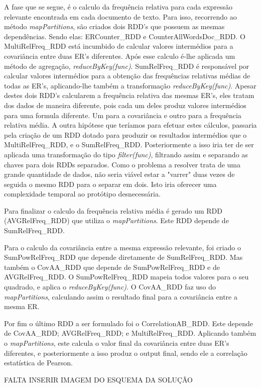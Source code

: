 A fase que se segue, é o calculo da frequência relativa para cada expressão relevante encontrada em cada documento de texto. Para isso, recorrendo ao método \textit{mapPartitions}, são criados dois RDD's que possuem as mesmas dependências. Sendo elas: ERCounter\_RDD e CounterAllWordsDoc\_RDD. O MultiRelFreq\_RDD está incumbido de calcular valores intermédios para a covariância entre duas ER's diferentes. Após esse calculo é-lhe aplicada um método de agregação, \textit{reduceByKey(func)}. SumRelFreq\_RDD é responsável por calcular valores intermédios para a obtenção das frequências relativas médias de todas as ER's, aplicando-lhe também a transformação \textit{reduceByKey(func)}. Apesar destes dois RDD's calcularem a frequência relativa das mesmas ER's, eles tratam dos dados de maneira diferente, pois cada um deles produz valores intermédios para uma formula diferente. Um para a covariância e outro para a frequência relativa média. A outra hipótese que teríamos para efetuar estes cálculos, passaria pela criação de um RDD dotado para produzir os resultados intermédios que o MultiRelFreq\_RDD, e o SumRelFreq\_RDD. Posteriormente a isso iria ter de ser aplicada uma transformação do tipo \textit{filter(func)}, filtrando assim e separando as chaves para dois RDDs separados. Como o problema a resolver trata de uma grande quantidade de dados, não seria viável estar a "varrer" duas vezes de seguida o mesmo RDD para o separar em dois. Isto iria oferecer uma complexidade temporal ao protótipo desnecessária.

Para finalizar o calculo da frequência relativa média é gerado um RDD (AVGRelFreq\_RDD) que utiliza o \textit{mapPartitions}. Este RDD depende de SumRelFreq\_RDD.

Para o calculo da covariância entre a mesma expressão relevante, foi criado o SumPowRelFreq\_RDD que depende diretamente de SumRelFreq\_RDD. Mas também o CovAA\_RDD que depende de SumPowRelFreq\_RDD e de AVGRelFreq\_RDD. O SumPowRelFreq\_RDD mapeia todos valores para o seu quadrado, e aplica o \textit{reduceByKey(func)}. O CovAA\_RDD faz uso do \textit{mapPartitions}, calculando assim o resultado final para a covariância entre a mesma ER.

Por fim o último RDD a ser formulado foi o CorrelationAB\_RDD. Este depende de CovAA\_RDD; AVGRelFreq\_RDD; e MultiRelFreq\_RDD. Aplicando também o \textit{mapPartitions}, este calcula o valor final da covariância entre duas ER's diferentes, e posteriormente a isso produz o output final, sendo ele a correlação estatística de Pearson.

FALTA INSERIR IMAGEM DO ESQUEMA DA SOLUÇÃO
 